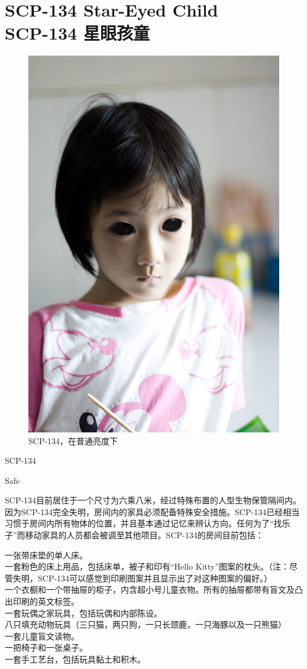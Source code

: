 \chapter[SCP-134 星眼孩童]{
    SCP-134 Star-Eyed Child\\
    SCP-134 星眼孩童
}

\label{chap:SCP-134}

\begin{figure}[H]
    \centering
    \includegraphics[width=0.5\linewidth]{images/SCP.134.jpg}
    \caption*{SCP-134，在普通亮度下}
\end{figure}

SCP-134

Safe

SCP-134目前居住于一个尺寸为六乘八米，经过特殊布置的人型生物保管隔间内。因为SCP-134完全失明，房间内的家具必须配备特殊安全措施。SCP-134已经相当习惯于房间内所有物体的位置，并且基本通过记忆来辨认方向。任何为了“找乐子”而移动家具的人员都会被调至其他项目。SCP-134的房间目前包括：

一张带床垫的单人床。\\
一套粉色的床上用品，包括床单，被子和印有“Hello Kitty”图案的枕头。（注：尽管失明，SCP-134可以感觉到印刷图案并且显示出了对这种图案的偏好。）\\
一个衣橱和一个带抽屉的柜子，内含超小号儿童衣物。所有的抽屉都带有盲文及凸出印刷的英文标签。\\
一套玩偶之家玩具，包括玩偶和内部陈设。\\
八只填充动物玩具（三只猫，两只狗，一只长颈鹿，一只海豚以及一只熊猫）\\
一套儿童盲文读物。\\
一把椅子和一张桌子。\\
一套手工艺台，包括玩具黏土和积木。


